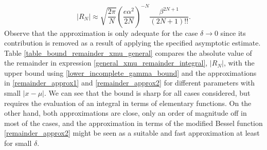 \documentclass[10pt,a4paper,oneside]{article}
\numberwithin{equation}{section}
\begin{document}
\begin{equation}
|R_N| \approx \sqrt{\frac{2\pi}{N}} \left(\frac{e\alpha^2}{2N}\right)^{-N} \frac{\beta^{2N + 1}}{(2N + 1)!!}.
\end{equation}
Observe that the approximation is only adequate for the case $\delta \to 0$ since its contribution is removed as a result of applying the specified asymptotic estimate. Table \ref{table_bound_remainder_xmu_general} compares the absolute value of the remainder in expression \eqref{general_xmu_remainder_integral}, $|R_N|$, with the upper bound using \eqref{lower_incomplete_gamma_bound} and the approximations in \eqref{remainder_approx1} and \eqref{remainder_approx2} for different parameters with small $|x-\mu|$. We can see that the bound is sharp for all cases considered, but requires the evaluation of an integral in terms of elementary functions. On the other hand, both approximations are close, only an order of magnitude off in most of the cases, and the approximation in terms of the modified Bessel function \eqref{remainder_approx2} might be seen as a suitable and fast approximation at least for small $\delta$.

\begin{table}[H]
	\centering
	\caption{Comparison of various approximations (\eqref{remainder_approx1} and \eqref{remainder_approx2}) and the upper bound \eqref{lower_incomplete_gamma_bound} for the estimation of the remainder \eqref{general_xmu_remainder_integral}.}
	\label{table_bound_remainder_xmu_general}
\end{table}
\end{document}
